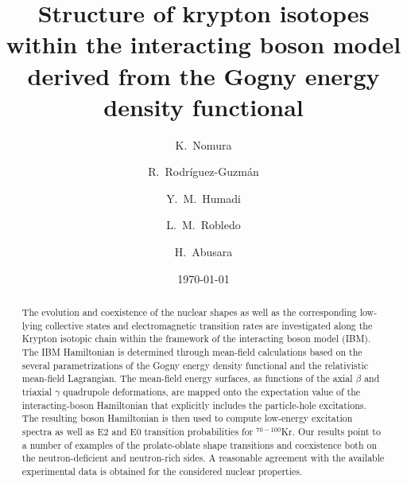 \documentclass[twocolumn,showpacs,amsmath,amssymb,superscriptaddress]{revtex4-1}
\begin{document}
\title{Structure of krypton isotopes within
the interacting boson model derived from the Gogny energy density functional}

\author{K.~Nomura}

\author{R.~Rodr\'iguez-Guzm\'an}


\author{Y.~M.~Humadi}


\author{L.~M.~Robledo}

\author{H.~Abusara}


\date{\today}

\begin{abstract}

The evolution and coexistence of the nuclear shapes as well as the 
corresponding low-lying collective states and electromagnetic transition rates
are investigated along the Krypton isotopic chain within the 
framework of the interacting boson model (IBM). The IBM 
Hamiltonian is determined through mean-field calculations based on 
the several parametrizations of the Gogny energy density functional 
and the relativistic 
mean-field Lagrangian. The mean-field energy surfaces, as functions 
of the axial $\beta$ and triaxial $\gamma$ quadrupole deformations, are 
mapped onto the expectation
 value of the  interacting-boson Hamiltonian that explicitly
 includes the particle-hole excitations. The  resulting 
 boson Hamiltonian is
 then  used to compute low-energy excitation
 spectra as well as E2 and E0 transition probabilities for
 $^{70-100}$Kr. Our results point to a number of examples of the
 prolate-oblate shape transitions and coexistence both on the
 neutron-deficient  
and neutron-rich sides. A reasonable agreement with the available 
experimental data is obtained for the considered nuclear properties. 

\end{abstract}

\keywords{}

\maketitle
\end{document}

